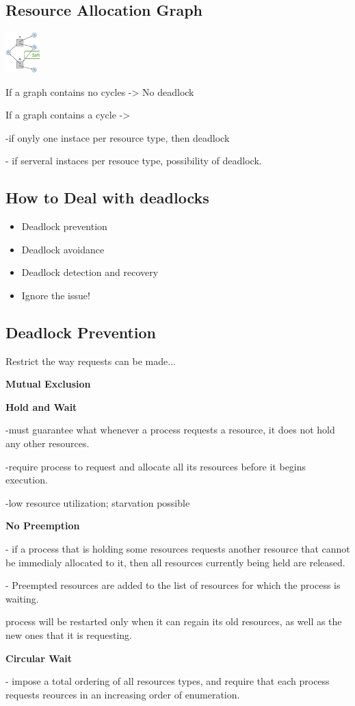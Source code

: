 \subsection{Resource Allocation Graph}

\includegraphics[width=0.1\textwidth]{concurrency-errors/ressourcegraph.png}

If a graph contains no cycles -> No deadlock \par
If a graph contains a cycle -> \par
-if onyly one instace per resource type, then deadlock\par
- if serveral instaces per resouce type, possibility of deadlock.

\subsection{How to Deal with deadlocks}

\begin{itemize}
    \item Deadlock prevention
    \item Deadlock avoidance
    \item Deadlock detection and recovery
    \item Ignore the issue!
\end{itemize}

\subsection{Deadlock Prevention}

Restrict the way requests can be made...\par
\textbf{Mutual Exclusion}\par
\textbf{Hold and Wait}\par
-must guarantee what whenever a process requests a resource, it does not hold any other resources.\par
-require process to request and allocate all its resources before it begins execution.\par
-low resource utilization; starvation possible\par
\textbf{No Preemption} \par
- if a process that is holding some resources requests another resource that cannot be immedialy allocated to it, then all resources currently being held are released.\par
- Preempted resources are added to the list of resources for which the process is waiting.\par
 process will be restarted only when it can regain its old resources, as well as the new ones that it is requesting.\par
 \textbf{Circular Wait}\par
 - impose a total ordering of all resources types, and require that each process requests reources in an increasing order of enumeration.

